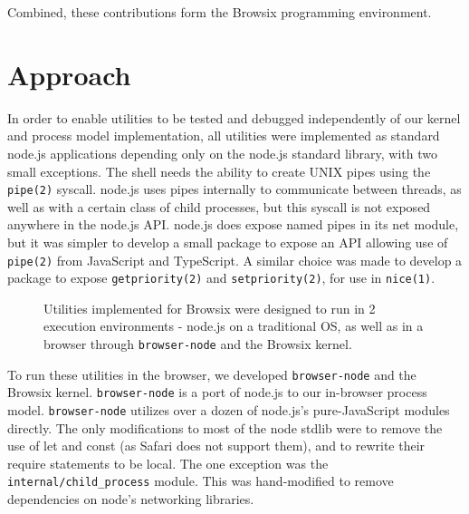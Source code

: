 \documentclass{acm_proc_article-sp}
\begin{document}
Combined, these contributions form the Browsix programming
environment.


\section{Approach}

In order to enable utilities to be tested and debugged independently
of our kernel and process model implementation, all utilities were
implemented as standard node.js applications depending only on the
node.js standard library, with two small exceptions.  The shell needs
the ability to create UNIX pipes using the \texttt{pipe(2)} syscall.
node.js uses pipes internally to communicate between threads, as well
as with a certain class of child processes, but this syscall is not
exposed anywhere in the node.js API.  node.js does expose named pipes
in its net module, but it was simpler to develop a small package to
expose an API allowing use of \texttt{pipe(2)} from JavaScript and
TypeScript.  A similar choice was made to develop a package to expose
\texttt{getpriority(2)} and \texttt{setpriority(2)}, for use in
\texttt{nice(1)}.

\begin{figure}
\centering
{}
\caption{Utilities implemented for Browsix were designed to run in 2
  execution environments - node.js on a traditional OS, as well as in
  a browser through \texttt{browser-node} and the Browsix kernel.}
\end{figure}

To run these utilities in the browser, we developed
\texttt{browser-node} and the Browsix kernel.  \texttt{browser-node}
is a port of node.js to our in-browser process model.
\texttt{browser-node} utilizes over a dozen of node.js's
pure-JavaScript modules directly.  The only modifications to most of
the node stdlib were to remove the use of let and const (as Safari
does not support them), and to rewrite their require statements to be
local.  The one exception was the \texttt{internal/child\_process}
module.  This was hand-modified to remove dependencies on node's
networking libraries.
\end{document}
